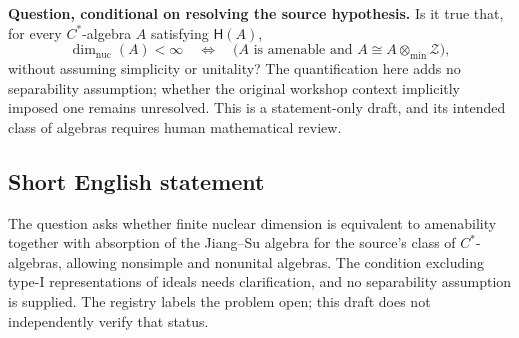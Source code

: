 \documentclass[11pt]{article}
\begin{document}
\textbf{Question, conditional on resolving the source hypothesis.} Is it true that, for every \(C^*\)-algebra \(A\) satisfying \(\mathsf H(A)\),
\[
\dim_{\mathrm{nuc}}(A)<\infty
\quad\Longleftrightarrow\quad
\bigl(A\text{ is amenable and }A\cong A\otimes_{\min}\mathcal Z\bigr),
\]
without assuming simplicity or unitality? The quantification here adds no separability assumption; whether the original workshop context implicitly imposed one remains unresolved. This is a statement-only draft, and its intended class of algebras requires human mathematical review.
\subsection{Short English statement}
The question asks whether finite nuclear dimension is equivalent to amenability together with absorption of the Jiang--Su algebra for the source's class of \(C^*\)-algebras, allowing nonsimple and nonunital algebras. The condition excluding type-I representations of ideals needs clarification, and no separability assumption is supplied. The registry labels the problem open; this draft does not independently verify that status.
\end{document}
